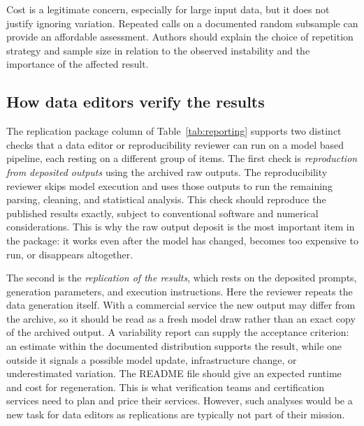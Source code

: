 \documentclass[11pt]{article}
\begin{document}

Cost is a legitimate concern, especially for large input data, but it does not justify ignoring variation. Repeated calls on a documented random subsample can provide an affordable assessment. Authors should explain the choice of repetition strategy and sample size in relation to the observed instability and the importance of the affected result.

\subsection{How data editors verify the results}\label{sec:how-to-verify}

The replication package column of Table~\ref{tab:reporting} supports two distinct checks that a data editor or reproducibility reviewer can run on a model based pipeline, each resting on a different group of items. The first check is \textit{reproduction from deposited outputs} using the archived raw outputs. The reproducibility reviewer skips model execution and uses those outputs to run the remaining parsing, cleaning, and statistical analysis. This check should reproduce the published results exactly, subject to conventional software and numerical considerations. This is why the raw output deposit is the most important item in the package: it works even after the model has changed, becomes too expensive to run, or disappears altogether.\medskip

The second is the \textit{replication of the results}, which rests on the deposited prompts, generation parameters, and execution instructions. Here the reviewer repeats the data generation itself. With a commercial service the new output may differ from the archive, so it should be read as a fresh model draw rather than an exact copy of the archived output. A variability report can supply the acceptance criterion: an estimate within the documented distribution supports the result, while one outside it signals a possible model update, infrastructure change, or underestimated variation. The README file should give an expected runtime and cost for regeneration. This is what verification teams and certification services need to plan and price their services. However, such analyses would be a new task for data editors as replications are typically not part of their mission.\medskip
\end{document}
